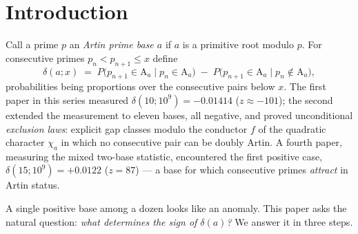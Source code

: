\documentclass[11pt,reqno]{amsart}
\theoremstyle{plain}
\theoremstyle{definition}
\newcommand{\Art}{\mathrm{A}}
\begin{document}
\maketitle

\section{Introduction}
\label{sec:intro}

Call a prime $p$ an \emph{Artin prime base $a$} if $a$ is a primitive root
modulo $p$. For consecutive primes $p_n < p_{n+1} \le x$ define
\begin{equation}
\label{eq:delta}
  \delta(a; x) \;=\; P\bigl(p_{n+1} \in \Art_a \mid p_n \in \Art_a\bigr)
             \;-\; P\bigl(p_{n+1} \in \Art_a \mid p_n \notin \Art_a\bigr),
\end{equation}
probabilities being proportions over the consecutive pairs below $x$. The
first paper in this series measured $\delta(10;10^9) = -0.01414$
($z \approx -101$); the second extended the measurement to eleven bases, all
negative, and proved unconditional \emph{exclusion laws}: explicit gap
classes modulo the conductor $f$ of the quadratic character
$\chi_a$ in which no consecutive pair can be doubly Artin. A fourth paper,
measuring the mixed two-base statistic, encountered the first positive case,
$\delta(15;10^9) = +0.0122$ ($z = 87$) --- a base for which consecutive
primes \emph{attract} in Artin status.

A single positive base among a dozen looks like an anomaly. This paper
asks the natural question: \emph{what determines the sign of $\delta(a)$?}
We answer it in three steps.
\end{document}
